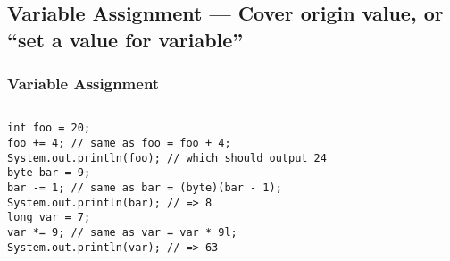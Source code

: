\documentclass[en, 11pt, xcolor=dvipsnames]{beamer}
\begin{document}
\subsection{Variable Assignment --- Cover origin value, or ``set a value for variable''}
\begin{frame}[fragile]
	\frametitle{Variable Assignment}


	\begin{columns}[c]
		\begin{column}{0.9\textwidth}

			\begin{lstlisting}[style=Java]
int foo = 20;
foo += 4; // same as foo = foo + 4;
System.out.println(foo); // which should output 24
byte bar = 9;
bar -= 1; // same as bar = (byte)(bar - 1);
System.out.println(bar); // => 8
long var = 7;
var *= 9; // same as var = var * 9l;
System.out.println(var); // => 63\end{lstlisting}

		\end{column}
	\end{columns}

\end{frame}
\end{document}

